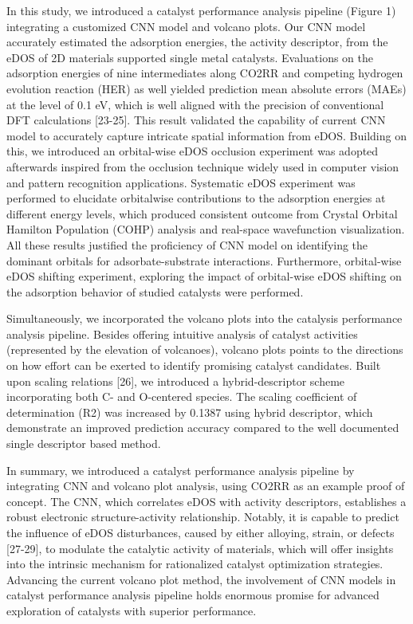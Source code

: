 In this study, we introduced a catalyst performance analysis pipeline (Figure 1) integrating a customized CNN model and volcano plots. Our CNN model accurately estimated the adsorption energies, the activity descriptor, from the eDOS of 2D materials supported single metal catalysts. Evaluations on the adsorption energies of nine intermediates along CO2RR and competing hydrogen evolution reaction (HER) as well yielded prediction mean absolute errors (MAEs) at the level of 0.1 eV, which is well aligned with the precision of conventional DFT calculations [23-25]. This result validated the capability of current CNN model to accurately capture intricate spatial information from eDOS. Building on this, we introduced an orbital-wise eDOS occlusion experiment was adopted afterwards inspired from the occlusion technique widely used in computer vision and pattern recognition applications. Systematic eDOS experiment was performed to elucidate orbitalwise contributions to the adsorption energies at different energy levels, which produced consistent outcome from Crystal Orbital Hamilton Population (COHP) analysis and real-space wavefunction visualization. All these results justified the proficiency of CNN model on identifying the dominant orbitals for adsorbate-substrate interactions. Furthermore, orbital-wise eDOS shifting experiment, exploring the impact of orbital-wise eDOS shifting on the adsorption behavior of studied catalysts were performed.

Simultaneously, we incorporated the volcano plots into the catalysis performance analysis pipeline. Besides offering intuitive analysis of catalyst activities (represented by the elevation of volcanoes), volcano plots points to the directions on how effort can be exerted to identify promising catalyst candidates. Built upon scaling relations [26], we introduced a hybrid-descriptor scheme incorporating both C- and O-centered species. The scaling coefficient of determination (R2) was increased by 0.1387 using hybrid descriptor, which demonstrate an improved prediction accuracy compared to the well documented single descriptor based method.

In summary, we introduced a catalyst performance analysis pipeline by integrating CNN and volcano plot analysis, using CO2RR as an example proof of concept. The CNN, which correlates eDOS with activity descriptors, establishes a robust electronic structure-activity relationship. Notably, it is capable to predict the influence of eDOS disturbances, caused by either alloying, strain, or defects [27-29], to modulate the catalytic activity of materials, which will offer insights into the intrinsic mechanism for rationalized catalyst optimization strategies. Advancing the current volcano plot method, the involvement of CNN models in catalyst performance analysis pipeline holds enormous promise for advanced exploration of catalysts with superior performance.
